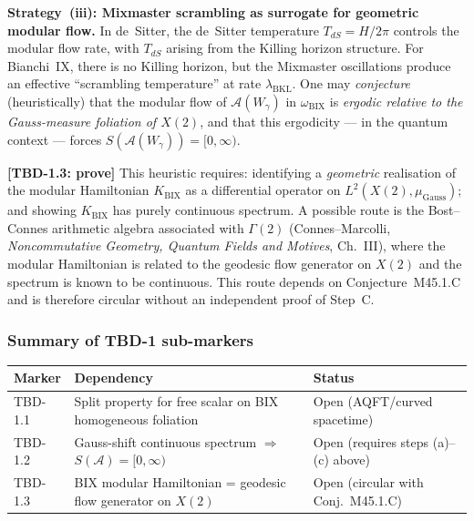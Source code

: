 \documentclass[12pt,a4paper]{article}
\begin{document}
\vspace{4pt}
\noindent\textbf{Strategy~(iii): Mixmaster scrambling as surrogate for geometric modular flow.}
In de~Sitter, the de~Sitter temperature $T_{dS} = H/2\pi$ controls the
modular flow rate, with $T_{dS}$ arising from the Killing horizon structure.
For Bianchi~IX, there is no Killing horizon, but the Mixmaster oscillations
produce an effective ``scrambling temperature'' at rate $\lambda_{\mathrm{BKL}}$.
One may \emph{conjecture} (heuristically) that the modular flow of
$\mathcal{A}(W_\gamma)$ in $\omega_{\mathrm{BIX}}$ is
\emph{ergodic relative to the Gauss-measure foliation of $X(2)$}, and
that this ergodicity --- in the quantum context --- forces
$S(\mathcal{A}(W_\gamma)) = [0,\infty)$.

\noindent\textbf{[TBD-1.3: prove]} This heuristic requires:
identifying a \emph{geometric} realisation of the modular Hamiltonian
$K_{\mathrm{BIX}}$ as a differential operator on
$L^2(X(2),\mu_{\mathrm{Gauss}})$;
and showing $K_{\mathrm{BIX}}$ has purely continuous spectrum.
A possible route is the Bost--Connes arithmetic algebra associated with
$\Gamma(2)$ (Connes--Marcolli, \emph{Noncommutative Geometry, Quantum
Fields and Motives}, Ch.~III), where the modular Hamiltonian is related
to the geodesic flow generator on $X(2)$ and the spectrum is known to be
continuous.
This route depends on Conjecture~M45.1.C and is therefore circular
without an independent proof of Step~C.

\subsubsection*{Summary of TBD-1 sub-markers}

\begin{center}
\small
\begin{tabular}{lll}
\toprule
Marker & Dependency & Status \\
\midrule
TBD-1.1 & Split property for free scalar on BIX homogeneous foliation
        & Open (AQFT/curved spacetime) \\
TBD-1.2 & Gauss-shift continuous spectrum $\Rightarrow$ $S(\mathcal{A})=[0,\infty)$
        & Open (requires steps (a)--(c) above) \\
TBD-1.3 & BIX modular Hamiltonian = geodesic flow generator on $X(2)$
        & Open (circular with Conj.~M45.1.C) \\
\bottomrule
\end{tabular}
\end{center}
\end{document}
